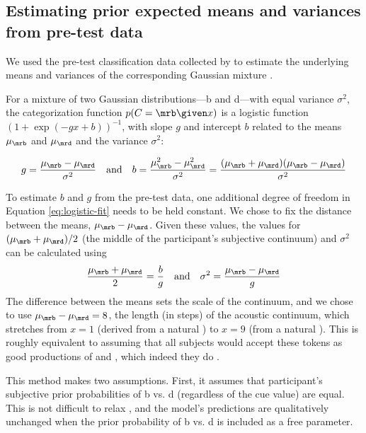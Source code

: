 \subsection{Estimating prior expected means and variances from pre-test data}
\label{sec:prior-expected-means}

We used the pre-test classification data collected by \textcite{Vroomen2007} to estimate the underlying means and variances of the corresponding Gaussian mixture \autocite{Feldman2009a}.

For a mixture of two Gaussian distributions---\ph b and \ph d---with equal variance $\sigma^2$, the categorization function $p(C=\mrb \given x)$ is a logistic function $(1+\exp(-gx + b))^{-1}$, with slope $g$ and intercept $b$ related to the means $\mu_\mrb$ and $\mu_\mrd$ and the variance $\sigma^2$:

\begin{equation}
\label{eq:logistic-fit}
g = \frac{\mu_\mrb-\mu_\mrd}{\sigma^2} \quad \mathrm{and} \quad b= \frac{\mu_\mrb^2 - \mu_\mrd^2}{\sigma^2} = \frac{(\mu_\mrb + \mu_\mrd)(\mu_\mrb - \mu_\mrd)}{\sigma^2}
\end{equation}

To estimate $b$ and $g$ from the pre-test data, one additional degree of freedom in Equation \ref{eq:logistic-fit} needs to be held constant. We chose to fix the distance between the means, $\mu_\mrb-\mu_\mrd$.  Given these values, the values for $(\mu_\mrb+\mu_\mrd)/2$ (the middle of the participant's subjective continuum) and $\sigma^2$ can be calculated using
\begin{equation}
\label{eq:prior-vals}
\frac{\mu_\mrb+\mu_\mrd}{2} = \frac{b}{g} \quad\mathrm{and}\quad \sigma^2 = \frac {\mu_\mrb-\mu_\mrd}{g}
\end{equation}
The difference between the means sets the scale of the continuum, and we chose to use $\mu_\mrb-\mu_\mrd=8$, the length (in steps) of the acoustic continuum, which stretches from $x=1$ (derived from a natural ) to $x=9$ (from a natural ).  This is roughly equivalent to assuming that all subjects would accept these tokens as good productions of  and , which indeed they do \autocite{Vroomen2004}.

This method makes two assumptions.  First, it assumes that participant's subjective prior probabilities of \ph b vs. \ph d (regardless of the cue value) are equal.  This is not difficult to relax \autocite[it only shifts the boundary of the classification function by the log ratio of the prior probabilities;][]{Feldman2009a}, and the model's predictions are qualitatively unchanged when the prior probability of \ph b vs. \ph d is included as a free parameter.

